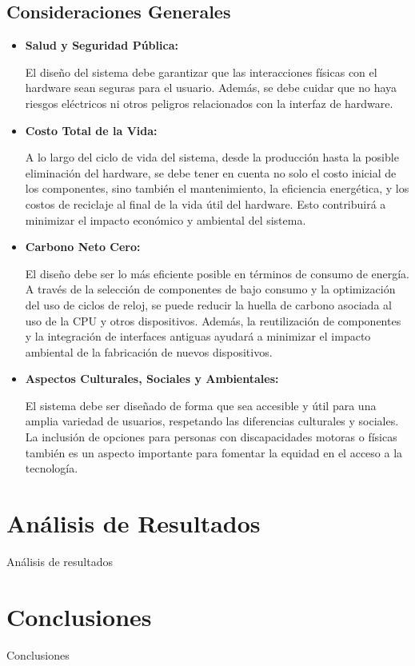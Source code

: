 \documentclass[conference]{IEEEtran}
\begin{document}
\subsection{Consideraciones Generales}
\begin{itemize}
	\item \textbf{Salud y Seguridad Pública:} 
	\par El diseño del sistema debe garantizar que las interacciones físicas con el hardware sean seguras para el usuario. Además, se debe cuidar que no haya riesgos eléctricos ni otros peligros relacionados con la interfaz de hardware.
	
	\item \textbf{Costo Total de la Vida: }
	\par A lo largo del ciclo de vida del sistema, desde la producción hasta la posible eliminación del hardware, se debe tener en cuenta no solo el costo inicial de los componentes, sino también el mantenimiento, la eficiencia energética, y los costos de reciclaje al final de la vida útil del hardware. Esto contribuirá a minimizar el impacto económico y ambiental del sistema.
	
	\item \textbf{Carbono Neto Cero:} 
	\par El diseño debe ser lo más eficiente posible en términos de consumo de energía. A través de la selección de componentes de bajo consumo y la optimización del uso de ciclos de reloj, se puede reducir la huella de carbono asociada al uso de la CPU y otros dispositivos. Además, la reutilización de componentes y la integración de interfaces antiguas ayudará a minimizar el impacto ambiental de la fabricación de nuevos dispositivos.
	
	\item \textbf{Aspectos Culturales, Sociales y Ambientales:}
	\par El sistema debe ser diseñado de forma que sea accesible y útil para una amplia variedad de usuarios, respetando las diferencias culturales y sociales. La inclusión de opciones para personas con discapacidades motoras o físicas también es un aspecto importante para fomentar la equidad en el acceso a la tecnología.
\end{itemize}

\section{Análisis de Resultados}
Análisis de resultados
\section{Conclusiones}
Conclusiones

\nocite{*}
\printbibliography
\end{document}
